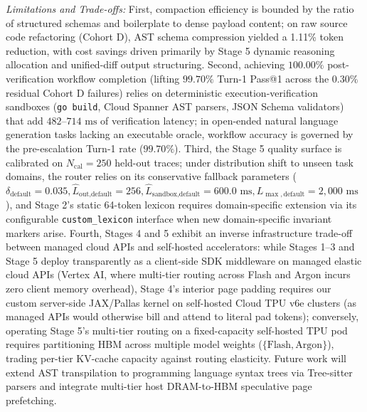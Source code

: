 \documentclass[conference,10pt]{IEEEtran}
\begin{document}
\textit{Limitations and Trade-offs:} First, compaction efficiency is bounded by the ratio of structured schemas and boilerplate to dense payload content; on raw source code refactoring (Cohort D), AST schema compression yielded a 1.11\% token reduction, with cost savings driven primarily by Stage 5 dynamic reasoning allocation and unified-diff output structuring. Second, achieving $100.00\%$ post-verification workflow completion (lifting $99.70\%$ Turn-1 Pass@1 across the $0.30\%$ residual Cohort D failures) relies on deterministic execution-verification sandboxes (\texttt{go build}, Cloud Spanner AST parsers, JSON Schema validators) that add $482\text{--}714\text{ ms}$ of verification latency; in open-ended natural language generation tasks lacking an executable oracle, workflow accuracy is governed by the pre-escalation Turn-1 rate ($99.70\%$). Third, the Stage 5 quality surface is calibrated on $N_{\text{cal}}=250$ held-out traces; under distribution shift to unseen task domains, the router relies on its conservative fallback parameters ($\delta_{\text{default}}=0.035, \hat{L}_{\text{out,default}}=256, \hat{L}_{\text{sandbox,default}}=600.0\text{ ms}, L_{\max,\text{default}}=2{,}000\text{ ms}$), and Stage 2's static 64-token lexicon requires domain-specific extension via its configurable \texttt{custom\_lexicon} interface when new domain-specific invariant markers arise. Fourth, Stages 4 and 5 exhibit an inverse infrastructure trade-off between managed cloud APIs and self-hosted accelerators: while Stages 1--3 and Stage 5 deploy transparently as a client-side SDK middleware on managed elastic cloud APIs (Vertex AI, where multi-tier routing across Flash and Argon incurs zero client memory overhead), Stage 4's interior page padding requires our custom server-side JAX/Pallas kernel on self-hosted Cloud TPU v6e clusters (as managed APIs would otherwise bill and attend to literal pad tokens); conversely, operating Stage 5's multi-tier routing on a fixed-capacity self-hosted TPU pod requires partitioning HBM across multiple model weights ($\{\text{Flash}, \text{Argon}\}$), trading per-tier KV-cache capacity against routing elasticity. Future work will extend AST transpilation to programming language syntax trees via Tree-sitter parsers and integrate multi-tier host DRAM-to-HBM speculative page prefetching.
\end{document}
